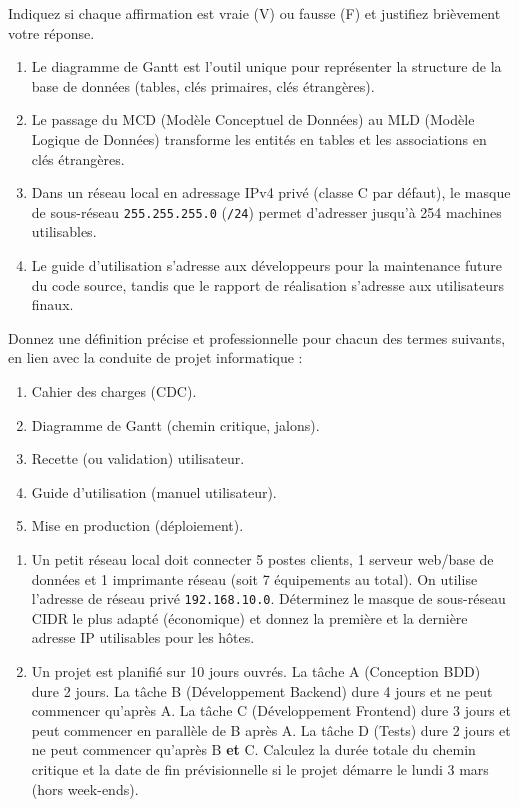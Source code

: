 \documentclass[11pt]{article}
\begin{document}
\begin{exercice}
Indiquez si chaque affirmation est vraie (V) ou fausse (F) et justifiez brièvement votre réponse.
\begin{enumerate}
    \item Le diagramme de Gantt est l'outil unique pour représenter la structure de la base de données (tables, clés primaires, clés étrangères).
    \item Le passage du MCD (Modèle Conceptuel de Données) au MLD (Modèle Logique de Données) transforme les entités en tables et les associations en clés étrangères.
    \item Dans un réseau local en adressage IPv4 privé (classe C par défaut), le masque de sous-réseau \texttt{255.255.255.0} (\texttt{/24}) permet d'adresser jusqu'à 254 machines utilisables.
    \item Le guide d'utilisation s'adresse aux développeurs pour la maintenance future du code source, tandis que le rapport de réalisation s'adresse aux utilisateurs finaux.
\end{enumerate}
\end{exercice}

\begin{exercice}
Donnez une définition précise et professionnelle pour chacun des termes suivants, en lien avec la conduite de projet informatique :
\begin{enumerate}
    \item Cahier des charges (CDC).
    \item Diagramme de Gantt (chemin critique, jalons).
    \item Recette (ou validation) utilisateur.
    \item Guide d'utilisation (manuel utilisateur).
    \item Mise en production (déploiement).
\end{enumerate}
\end{exercice}

\begin{exercice}
\begin{enumerate}
    \item Un petit réseau local doit connecter 5 postes clients, 1 serveur web/base de données et 1 imprimante réseau (soit 7 équipements au total). On utilise l'adresse de réseau privé \texttt{192.168.10.0}. Déterminez le masque de sous-réseau CIDR le plus adapté (économique) et donnez la première et la dernière adresse IP utilisables pour les hôtes.
    \item Un projet est planifié sur 10 jours ouvrés. La tâche A (Conception BDD) dure 2 jours. La tâche B (Développement Backend) dure 4 jours et ne peut commencer qu'après A. La tâche C (Développement Frontend) dure 3 jours et peut commencer en parallèle de B après A. La tâche D (Tests) dure 2 jours et ne peut commencer qu'après B \textbf{et} C. Calculez la durée totale du chemin critique et la date de fin prévisionnelle si le projet démarre le lundi 3 mars (hors week-ends).
\end{enumerate}
\end{exercice}
\end{document}
